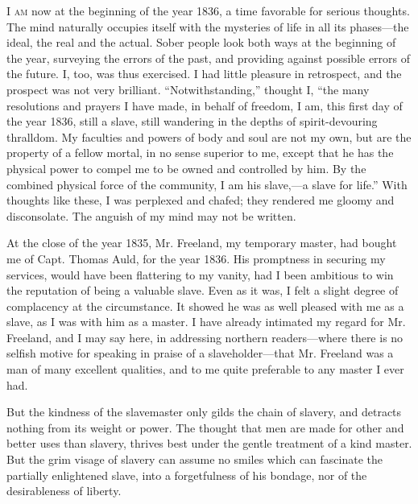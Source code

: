\textsc{I am} now at the beginning of the year 1836, a time favorable
for serious thoughts. The mind naturally occupies itself with the
mysteries of life in all its phases---the ideal, the real and the
actual. Sober people look both ways at the beginning of the year,
surveying the errors of the past, and providing against possible errors
of the future. I, too, was thus exercised. I had little pleasure in
retrospect, and the {\protect\hypertarget{272}{}{}}prospect was not very
brilliant. ``Notwithstanding,'' thought I, ``the many resolutions and
prayers I have made, in behalf of freedom, I am, this first day of the
year 1836, still a slave, still wandering in the depths of
spirit-devouring thralldom. My faculties and powers of body and soul are
not my own, but are the property of a fellow mortal, in no sense
superior to me, except that he has the physical power to compel me to be
owned and controlled by him. By the combined physical force of the
community, I am his slave,---a slave for life.'' With thoughts like
these, I was perplexed and chafed; they rendered me gloomy and
disconsolate. The anguish of my mind may not be written.

At the close of the year 1835, Mr. Freeland, my temporary master, had
bought me of Capt. Thomas Auld, for the year 1836. His promptness in
securing my services, would have been flattering to my vanity, had I
been ambitious to win the reputation of being a valuable slave. Even as
it was, I felt a slight degree of complacency at the circumstance. It
showed he was as well pleased with me as a slave, as I was with him as a
master. I have already intimated my regard for Mr. Freeland, and I may
say here, in addressing northern readers---where there is no selfish
motive for speaking in praise of a slaveholder---that Mr. Freeland was a
man of many excellent qualities, and to me quite preferable to any
master I ever had.

But the kindness of the slavemaster only gilds the chain of slavery, and
detracts nothing from its weight or power. The thought that men are made
for other {\protect\hypertarget{273}{}{}}and better uses than slavery,
thrives best under the gentle treatment of a kind master. But the grim
visage of slavery can assume no smiles which can fascinate the partially
enlightened slave, into a forgetfulness of his bondage, nor of the
desirableness of liberty.

